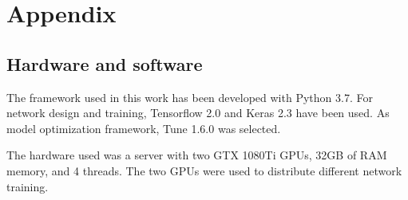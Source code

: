 \documentclass[PHM, 2021]{PHMSociety}
\begin{document}
\section*{Appendix}

\subsection*{Hardware and software}

The framework used in this work has been developed with Python 3.7. For network design and training, Tensorflow 2.0 \cite{abadi2016tensorflow} and Keras 2.3 \cite{gulli2017deep} have been used. As model optimization framework, Tune 1.6.0 \cite{liaw2018tune} was selected.

The hardware used was a server with two GTX 1080Ti GPUs, 32GB of RAM memory, and 4 threads. The two GPUs were used to distribute different network training.
\end{document}
